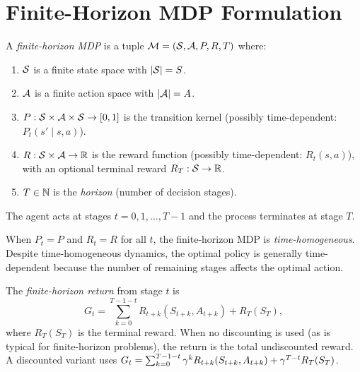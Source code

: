 \documentclass[11pt,a4paper]{article}
\begin{document}

\section{Finite-Horizon MDP Formulation}
\label{sec:formulation}

\begin{definition}
\label{def:finite-horizon-mdp}
A \emph{finite-horizon MDP} is a tuple
$\mathcal{M} = (\mathcal{S}, \mathcal{A}, P, R, T)$ where:
\begin{enumerate}[nosep]
    \item $\mathcal{S}$ is a finite state space with $|\mathcal{S}| = S$.
    \item $\mathcal{A}$ is a finite action space with $|\mathcal{A}| = A$.
    \item $P : \mathcal{S} \times \mathcal{A} \times \mathcal{S} \to [0,1]$ is
    the transition kernel (possibly time-dependent:
    $P_t(s' \mid s, a)$).
    \item $R : \mathcal{S} \times \mathcal{A} \to \mathbb{R}$ is the reward function
    (possibly time-dependent: $R_t(s,a)$), with an optional terminal
    reward $R_T : \mathcal{S} \to \mathbb{R}$.
    \item $T \in \mathbb{N}$ is the \emph{horizon} (number of decision
    stages).
\end{enumerate}
The agent acts at stages $t = 0, 1, \ldots, T-1$ and the process
terminates at stage $T$.
\end{definition}

\begin{remark}
\label{rem:time-homogeneous}
When $P_t = P$ and $R_t = R$ for all $t$, the finite-horizon MDP is
\emph{time-homogeneous}. Despite time-homogeneous dynamics, the
optimal policy is generally time-dependent because the number of
remaining stages affects the optimal action.
\end{remark}

\begin{definition}
\label{def:finite-return}
The \emph{finite-horizon return} from stage $t$ is
\[
    G_t = \sum_{k=0}^{T-1-t} R_{t+k}(S_{t+k}, A_{t+k}) + R_T(S_T),
\]
where $R_T(S_T)$ is the terminal reward. When no discounting is used
(as is typical for finite-horizon problems), the return is the total
undiscounted reward. A discounted variant uses
$G_t = \sum_{k=0}^{T-1-t} \gamma^k R_{t+k}(S_{t+k}, A_{t+k})
+ \gamma^{T-t} R_T(S_T)$.
\end{definition}
\end{document}

